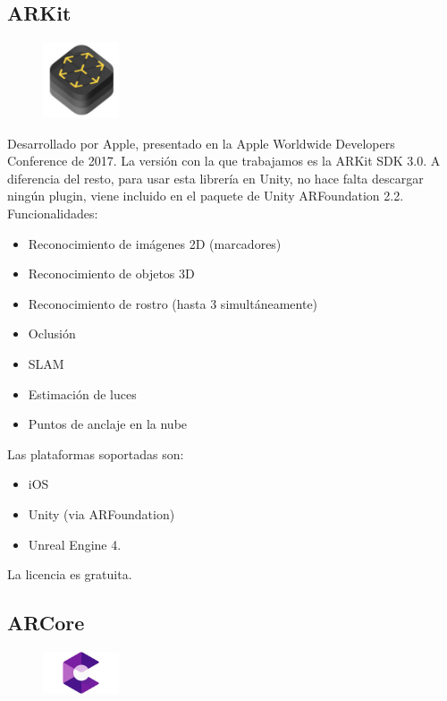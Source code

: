 \clearpage
\subsection{ARKit}
\begin{figure}[H]
    \centering
    \includegraphics[width=0.2\textwidth]{Images/Arkit_Logo.jpeg}
    \label{fig:ARKit}
\end{figure} 

Desarrollado por Apple, presentado en la Apple Worldwide Developers Conference de 2017.
La versión con la que trabajamos es la ARKit SDK 3.0.\cite{AppleDeve} A diferencia del resto, para usar esta librería en Unity, no hace falta descargar ningún plugin, viene incluido en el paquete de Unity ARFoundation 2.2.
Funcionalidades:
\begin{itemize}
\item Reconocimiento de imágenes 2D (marcadores)
\item Reconocimiento de objetos 3D
\item Reconocimiento de rostro (hasta 3 simultáneamente)
\item Oclusión
\item SLAM
\item Estimación de luces
\item Puntos de anclaje en la nube
\end{itemize}
Las plataformas soportadas son:
\begin{itemize}
\item iOS 
\item Unity (via ARFoundation)
\item Unreal Engine 4.\cite{Unreal}
\end{itemize}
La licencia es gratuita.

 \clearpage
\subsection{ARCore}
 \begin{figure}[H]
    \centering
    \includegraphics[width=0.2\textwidth]{Images/ARCore.jpeg}
    \label{fig:ARCore}
\end{figure}

